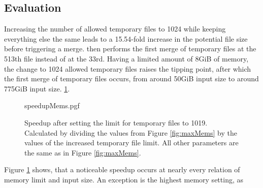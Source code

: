 \subsection{Evaluation}
Increasing the number of allowed temporary files to 1024 while keeping everything else the same leads to a 15.54-fold increase in the potential file size before triggering a merge. \sort then performs the first merge of temporary files at the 513th file instead of at the 33rd. Having a limited amount of 8GiB of memory, the change to 1024 allowed temporary files raises the tipping point, after which the first merge of temporary files occurs, from around 50GiB input size to around 775GiB input size.
\ref{fig:memSpeedup}.\\
\begin{figure}
        {speedupMems.pgf}
    \caption{Speedup after setting the limit for temporary files to 1019. Calculated by dividing the values from Figure \ref{fig:maxMems} by the values of the increased temporary file limit. All other parameters are the same as in Figure \ref{fig:maxMems}.}
    \label{fig:memSpeedup}
\end{figure}
Figure \ref{fig:memSpeedup} shows, that a noticeable speedup occurs at nearly every relation of memory limit and input size. An exception is the highest memory setting, as 